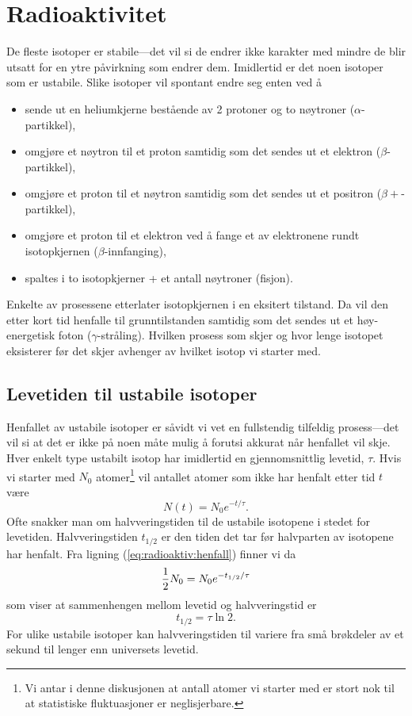 \chapter{Radioaktivitet}
De fleste isotoper er stabile---det vil si de endrer ikke karakter med mindre de blir utsatt for en ytre påvirkning som endrer dem. Imidlertid er det noen isotoper som er ustabile. Slike isotoper vil spontant endre seg enten ved å
\begin{itemize}
\item
sende ut en heliumkjerne bestående av 2 protoner og to nøytroner ($\alpha$-partikkel),
\item
omgjøre et nøytron til et proton samtidig som det sendes ut et elektron ($\beta$-partikkel),
\item
omgjøre et proton til et nøytron samtidig som det sendes ut et positron ($\beta+$-partikkel),
\item
omgjøre et proton til et elektron ved å fange et av elektronene rundt isotopkjernen ($\beta$-innfanging),
\item
spaltes i to isotopkjerner + et antall nøytroner (fisjon).
\end{itemize}
Enkelte av prosessene etterlater isotopkjernen i en eksitert tilstand. Da vil den etter kort tid henfalle til grunntilstanden samtidig som det sendes ut et høy-energetisk foton ($\gamma$-stråling). Hvilken prosess som skjer og hvor lenge isotopet eksisterer før det skjer avhenger av hvilket isotop vi starter med.

\section{Levetiden til ustabile isotoper}
Henfallet av ustabile isotoper er såvidt vi vet en fullstendig tilfeldig prosess---det vil si at det er ikke på noen måte mulig å forutsi akkurat når henfallet vil skje. Hver enkelt type ustabilt isotop har imidlertid en gjennomsnittlig levetid, $\tau$.  Hvis vi starter med $N_0$ atomer\footnote{Vi antar i denne diskusjonen at antall atomer vi starter med er stort nok til at statistiske fluktuasjoner er neglisjerbare.} vil antallet atomer som ikke har henfalt etter tid $t$ være
\begin{equation}
	N(t) = N_0e^{-t/\tau}.
	\label{eq:radioaktiv:henfall}
\end{equation}
Ofte snakker man om halvveringstiden til de ustabile isotopene i stedet for levetiden. Halvveringstiden $t_{1/2}$ er den tiden det tar før halvparten av isotopene har henfalt. Fra ligning (\ref{eq:radioaktiv:henfall}) finner vi da
\begin{displaymath}
	\frac{1}{2} N_0 = N_0e^{-t_{1/2}/\tau}
\end{displaymath}
som viser at sammenhengen mellom levetid og halvveringstid er
\begin{equation}
	t_{1/2} = \tau\ln 2.
\end{equation}
For ulike ustabile isotoper kan halvveringstiden til variere fra små brøkdeler av et sekund til lenger enn universets levetid. 

